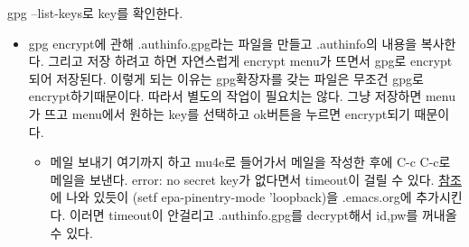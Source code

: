 \documentclass[11pt]{article}
\begin{document}
\begin{itemize}
\begin{itemize}
\begin{itemize}
gpg --list-keys로 key를 확인한다.
\end{itemize}
\begin{itemize}
\item\relax [3] gpg encrypt에 관해
.authinfo.gpg라는 파일을 만들고 .authinfo의 내용을 복사한다. 그리고 저장 하려고 하면 자연스럽게 encrypt menu가 뜨면서 gpg로 encrypt되어 저장된다. 이렇게 되는 이유는 gpg확장자를 갖는 파일은 무조건 gpg로 encrypt하기때문이다. 따라서 별도의 작업이 필요치는 않다. 그냥 저장하면 menu가 뜨고 menu에서 원하는 key를 선택하고 ok버튼을 누르면 encrypt되기 때문이다.

\begin{itemize}
\item\relax [4] 메일 보내기
여기까지 하고 mu4e로 들어가서 메일을 작성한 후에 C-c C-c로 메일을 보낸다.
error: no secret key가 없다면서 timeout이 걸릴 수 있다.  \href{https://emacs.stackexchange.com/questions/27841/unable-to-decrypt-gpg-file-using-emacs-but-command-line-gpg-works}{참조}에 나와 있듯이 (setf epa-pinentry-mode 'loopback)을 .emacs.org에 추가시킨다. 이러면 timeout이 안걸리고 .authinfo.gpg를 decrypt해서 id,pw를 꺼내올 수 있다.
\end{itemize}
\end{itemize}
\end{itemize}
\end{itemize}
\end{document}
